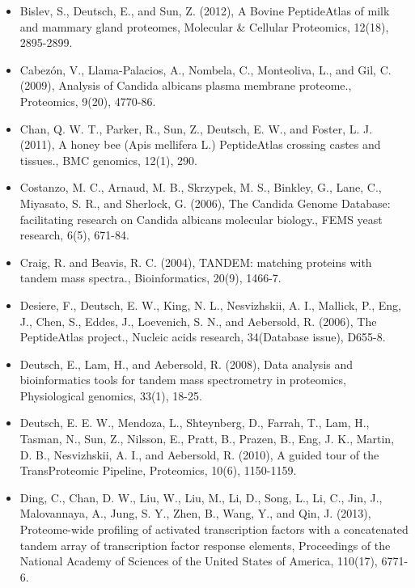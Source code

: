 \begin{itemize}

\item[]{
Bislev, S., Deutsch, E., and Sun, Z. (2012), A Bovine PeptideAtlas of milk and mammary gland
proteomes, Molecular \& Cellular Proteomics, 12(18), 2895-2899.
}

\item[]{
Cabez\'on, V., Llama-Palacios, A., Nombela, C., Monteoliva, L., and Gil, C. (2009), Analysis of
Candida albicans plasma membrane proteome., Proteomics, 9(20), 4770-86.
}

\item[]{
Chan, Q. W. T., Parker, R., Sun, Z., Deutsch, E. W., and Foster, L. J. (2011), A honey bee
(Apis mellifera L.) PeptideAtlas crossing castes and tissues., BMC genomics, 12(1), 290.
}

\item[]{
Costanzo, M. C., Arnaud, M. B., Skrzypek, M. S., Binkley, G., Lane, C., Miyasato, S. R., and
Sherlock, G. (2006), The Candida Genome Database: facilitating research on 
Candida albicans molecular biology., FEMS yeast research, 6(5), 671-84.
}

\item[]{
Craig, R. and Beavis, R. C. (2004), TANDEM: matching proteins with tandem mass spectra.,
Bioinformatics, 20(9), 1466-7.
}

\item[]{
Desiere, F., Deutsch, E. W., King, N. L., Nesvizhskii, A. I., Mallick, P., Eng, J., Chen, S., Eddes,
J., Loevenich, S. N., and Aebersold, R. (2006), The PeptideAtlas project., Nucleic acids
research, 34(Database issue), D655-8.
}

\item[]{
Deutsch, E., Lam, H., and Aebersold, R. (2008), Data analysis and bioinformatics tools for
tandem mass spectrometry in proteomics, Physiological genomics, 33(1), 18-25.
}

\item[]{
Deutsch, E. E. W., Mendoza, L., Shteynberg, D., Farrah, T., Lam, H., Tasman, N., Sun, Z.,
Nilsson, E., Pratt, B., Prazen, B., Eng, J. K., Martin, D. B., Nesvizhskii, A. I., and Aebersold,
R. (2010), A guided tour of the TransProteomic Pipeline, Proteomics, 10(6), 1150-1159.
}

\item[]{
Ding, C., Chan, D. W., Liu, W., Liu, M., Li, D., Song, L., Li, C., Jin, J., Malovannaya, A., Jung,
S. Y., Zhen, B., Wang, Y., and Qin, J. (2013), Proteome-wide profiling of activated 
transcription factors with a concatenated tandem array of transcription factor response elements,
Proceedings of the National Academy of Sciences of the United States of America, 110(17),
6771-6.
}


\end{itemize}
